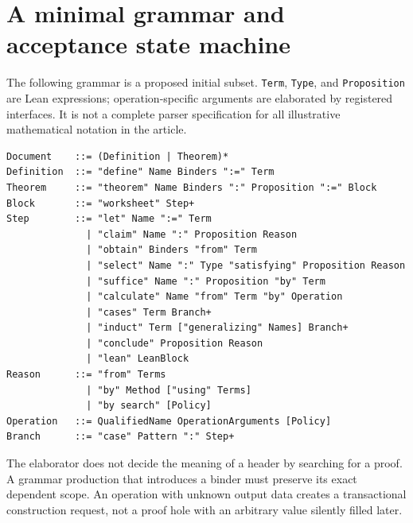 \documentclass[11pt,a4paper]{article}
\newcommand{\code}[1]{\nolinkurl{#1}}
\theoremstyle{definition}
\begin{document}
\section{A minimal grammar and acceptance state machine}
\label{app:grammar}
The following grammar is a proposed initial subset. \code{Term}, \code{Type},
and \code{Proposition} are Lean expressions; operation-specific arguments are
elaborated by registered interfaces. It is not a complete parser specification
for all illustrative mathematical notation in the article.
\par\noindent\begin{minipage}{\linewidth}
\begin{lstlisting}
Document    ::= (Definition | Theorem)*
Definition  ::= "define" Name Binders ":=" Term
Theorem     ::= "theorem" Name Binders ":" Proposition ":=" Block
Block       ::= "worksheet" Step+
Step        ::= "let" Name ":=" Term
              | "claim" Name ":" Proposition Reason
              | "obtain" Binders "from" Term
              | "select" Name ":" Type "satisfying" Proposition Reason
              | "suffice" Name ":" Proposition "by" Term
              | "calculate" Name "from" Term "by" Operation
              | "cases" Term Branch+
              | "induct" Term ["generalizing" Names] Branch+
              | "conclude" Proposition Reason
              | "lean" LeanBlock
Reason      ::= "from" Terms
              | "by" Method ["using" Terms]
              | "by search" [Policy]
Operation   ::= QualifiedName OperationArguments [Policy]
Branch      ::= "case" Pattern ":" Step+
\end{lstlisting}
\end{minipage}\par
The elaborator does not decide the meaning of a header by searching for a proof.
A grammar production that introduces a binder must preserve its exact dependent
scope. An operation with unknown output data creates a transactional construction
request, not a proof hole with an arbitrary value silently filled later.
\end{document}
